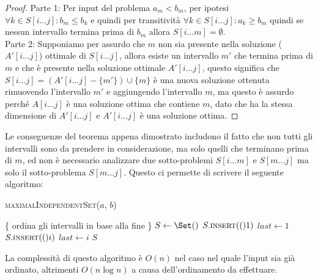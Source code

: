         \begin{proof}
            Parte 1: Per input del problema $a_m < b_m$, per ipotesi $\forall k \in S[i\dots j]: b_m\leq b_k$ e quindi per transitività $\forall k \in S[i\dots j]: a_k \geq b_m$ quindi se nessun intervallo termina prima di $b_m$ allora $S[i\dots m] = \emptyset$.\\
            Parte 2: Supponiamo per assurdo che $m$ non sia presente nella soluzione ($A'[i\dots j]$) ottimale di $S[i\dots j]$, allora esiste un intervallo $m'$ che termina prima di $m$ e che è presente nella soluzione ottimale $A'[i\dots j]$, questo significa che $S[i\dots j] = (A'[i\dots j]-\{m'\})\cup \{m\}$ è una nuova soluzione ottenuta rimuovendo l'intervallo $m'$ e aggiungendo l'intervallo $m$, ma questo è assurdo perché $A[i\dots j]$ è una soluzione ottima che contiene $m$, dato che ha la stessa dimensione di $A'[i\dots j]$ e $A'[i\dots j]$ è una soluzione ottima.
        \end{proof}
        Le conseguenze del teorema appena dimostrato includono il fatto che non tutti gli intervalli sono da prendere in considerazione, ma solo quelli che terminano prima di $m$, ed non è necessario analizzare due sotto-problemi $S[i\dots m]$ e $S[m\dots j]$ ma solo il sotto-problema $S[m\dots j]$. Questo ci permette di scrivere il seguente algoritmo:
        \begin{algorithm}[H]
            \caption{\Set \textsc{maximalIndependentSet}(\Int[] $a$, \Int[] $b$)}
            \begin{algorithmic}
                \State \{ ordina gli intervalli in base alla fine \}
                \State \Set $S \gets \Set()$
                \State $S.\Call{insert}(1)$
                \State \Int $last \gets 1$
                        \State $S.\Call{insert}(i)$
                        \State $last \gets i$
                    \EndIf
                \EndFor
                \State \Return $S$
            \end{algorithmic}
        \end{algorithm}
        La complessità di questo algoritmo è $O(n)$ nel caso nel quale l'input sia già ordinato, altrimenti $O(n\log n)$ a causa dell'ordinamento da effettuare.

